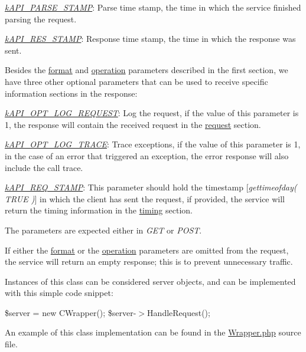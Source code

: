 \begin{DoxyItemize}
\begin{DoxyItemize}
\item {\itshape \hyperlink{}{k\-A\-P\-I\-\_\-\-P\-A\-R\-S\-E\-\_\-\-S\-T\-A\-M\-P}\/}\-: Parse time stamp, the time in which the service finished parsing the request. 
\item {\itshape \hyperlink{}{k\-A\-P\-I\-\_\-\-R\-E\-S\-\_\-\-S\-T\-A\-M\-P}\/}\-: Response time stamp, the time in which the response was sent. 
\end{DoxyItemize}
\end{DoxyItemize}

Besides the \hyperlink{}{format} and \hyperlink{}{operation} parameters described in the first section, we have three other optional parameters that can be used to receive specific information sections in the response\-:


\begin{DoxyItemize}
\item {\itshape \hyperlink{}{k\-A\-P\-I\-\_\-\-O\-P\-T\-\_\-\-L\-O\-G\-\_\-\-R\-E\-Q\-U\-E\-S\-T}\/}\-: Log the request, if the value of this parameter is 1, the response will contain the received request in the \hyperlink{}{request} section. 
\item {\itshape \hyperlink{}{k\-A\-P\-I\-\_\-\-O\-P\-T\-\_\-\-L\-O\-G\-\_\-\-T\-R\-A\-C\-E}\/}\-: Trace exceptions, if the value of this parameter is 1, in the case of an error that triggered an exception, the error response will also include the call trace. 
\item {\itshape \hyperlink{}{k\-A\-P\-I\-\_\-\-R\-E\-Q\-\_\-\-S\-T\-A\-M\-P}\/}\-: This parameter should hold the timestamp \mbox{[}{\itshape gettimeofday( T\-R\-U\-E )\/}\mbox{]} in which the client has sent the request, if provided, the service will return the timing information in the \hyperlink{}{timing} section. 
\end{DoxyItemize}

The parameters are expected either in {\itshape G\-E\-T\/} or {\itshape P\-O\-S\-T\/}.

If either the \hyperlink{}{format} or the \hyperlink{}{operation} parameters are omitted from the request, the service will return an empty response; this is to prevent unnecessary traffic.

Instances of this class can be considered server objects, and can be implemented with this simple code snippet\-:

{\ttfamily  \$server = new C\-Wrapper(); \$server-\/$>$Handle\-Request(); }

An example of this class implementation can be found in the \hyperlink{}{Wrapper.\-php} source file.

